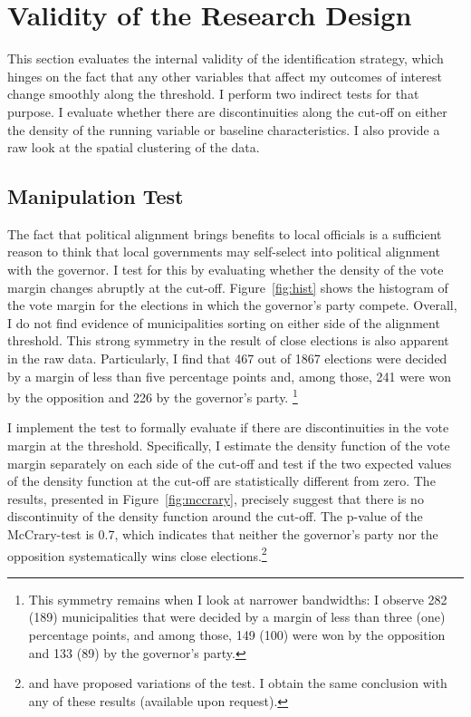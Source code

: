 \documentclass[dv_diss_main.tex]{subfiles}
\begin{document}
\section{Validity of the Research Design}

This section evaluates the internal validity of the identification strategy, which hinges on the fact that any other variables that affect my outcomes of interest change smoothly along the threshold. I perform two indirect tests for that purpose. I evaluate whether there are discontinuities along the cut-off on either the density of the running variable or baseline characteristics. I also provide a raw look at the spatial clustering of the data.

\subsection{Manipulation Test} The fact that political alignment brings benefits to local officials is a sufficient reason to think that local governments may self-select into political alignment with the governor. I test for this by evaluating whether the density of the vote margin changes abruptly at the cut-off. Figure~\ref{fig:hist} shows the histogram of the vote margin for the elections in which the governor's party compete. Overall, I do not find evidence of municipalities sorting on either side of the alignment threshold. This strong symmetry in the result of close elections is also apparent in the raw data. Particularly, I find that 467 out of 1867 elections were decided by a margin of less than five percentage points and, among those, 241 were won by the opposition and 226 by the governor's party. \footnote{This symmetry remains when I look at narrower bandwidths: I observe 282 (189) municipalities that were decided by a margin of less than three (one) percentage points, and among those, 149 (100) were won by the opposition and 133 (89) by the governor's party.} 

I implement the \cite{mccrary2008manipulation} test to formally evaluate if there are discontinuities in the vote margin at the threshold. Specifically, I estimate the density function of the vote margin separately on each side of the cut-off and test if the two expected values of the density function at the cut-off are statistically different from zero. The results, presented in Figure~\ref{fig:mccrary}, precisely suggest that there is no discontinuity of the density function around the cut-off. The p-value of the McCrary-test is 0.7, which indicates that neither the governor's party nor the opposition systematically wins close elections.\footnote{ \cite{calonico2020optimal} and \cite{bugni2021testing} have proposed variations of the \cite{mccrary2008manipulation} test. I obtain the same conclusion with any of these results (available upon request).}  
\end{document}
